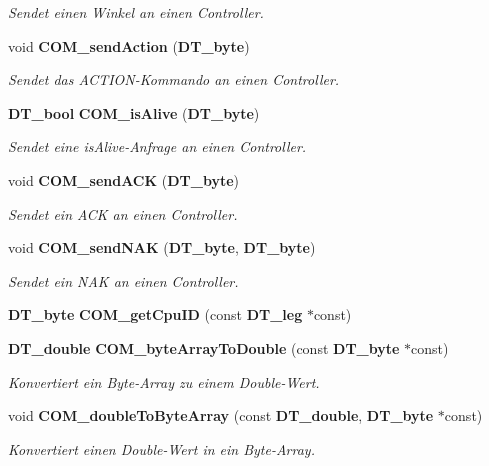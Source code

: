 \begin{DoxyCompactItemize}
\begin{DoxyCompactList}\small\item\em Sendet einen Winkel an einen Controller. \item\end{DoxyCompactList}\item 
void {\bf COM\_\-sendAction} ({\bf DT\_\-byte})
\begin{DoxyCompactList}\small\item\em Sendet das ACTION-\/Kommando an einen Controller. \item\end{DoxyCompactList}\item 
{\bf DT\_\-bool} {\bf COM\_\-isAlive} ({\bf DT\_\-byte})
\begin{DoxyCompactList}\small\item\em Sendet eine isAlive-\/Anfrage an einen Controller. \item\end{DoxyCompactList}\item 
void {\bf COM\_\-sendACK} ({\bf DT\_\-byte})
\begin{DoxyCompactList}\small\item\em Sendet ein ACK an einen Controller. \item\end{DoxyCompactList}\item 
void {\bf COM\_\-sendNAK} ({\bf DT\_\-byte}, {\bf DT\_\-byte})
\begin{DoxyCompactList}\small\item\em Sendet ein NAK an einen Controller. \item\end{DoxyCompactList}\item 
{\bf DT\_\-byte} {\bf COM\_\-getCpuID} (const {\bf DT\_\-leg} $\ast$const)
\item 
{\bf DT\_\-double} {\bf COM\_\-byteArrayToDouble} (const {\bf DT\_\-byte} $\ast$const)
\begin{DoxyCompactList}\small\item\em Konvertiert ein Byte-\/Array zu einem Double-\/Wert. \item\end{DoxyCompactList}\item 
void {\bf COM\_\-doubleToByteArray} (const {\bf DT\_\-double}, {\bf DT\_\-byte} $\ast$const)
\begin{DoxyCompactList}\small\item\em Konvertiert einen Double-\/Wert in ein Byte-\/Array. \item\end{DoxyCompactList}\item 

\end{DoxyCompactItemize}
